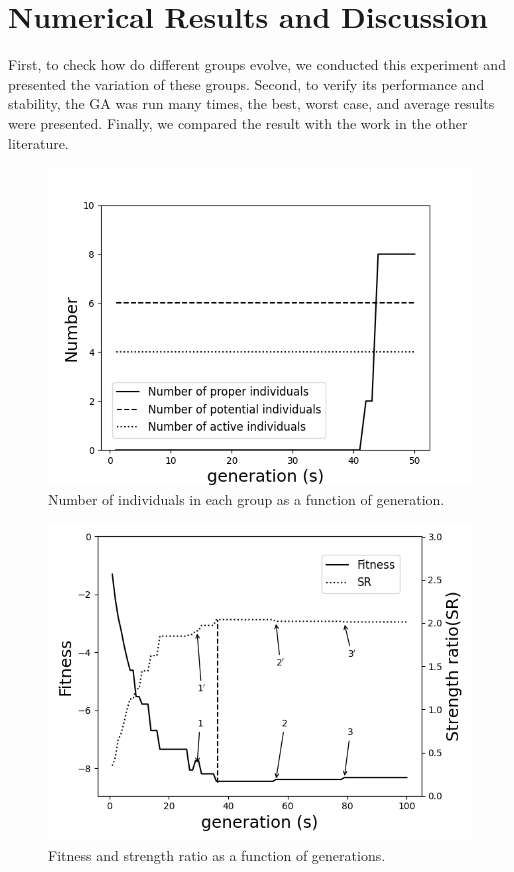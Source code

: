 \section{Numerical Results and Discussion}
First, to check how do different groups evolve, we conducted this experiment
and presented the variation of these groups. Second, to verify its performance
and stability, the GA was run many times, the best, worst case, and average
results were presented. Finally, we compared the result with the work in the
other literature.

\begin{figure}[!htb]
	\centering
	\includegraphics[width=\linewidth]{fig/group_number.png}
	\caption{Number of individuals in each group as a function of generation.}
	\label{fig:group}
\end{figure}

\begin{figure}[!htb]
	\centering
	\includegraphics[width=\linewidth]{fig/fitness_strength_ratio.png}
	\caption{Fitness and strength ratio as a function of generations.}
	\label{fig:sr}
\end{figure}



